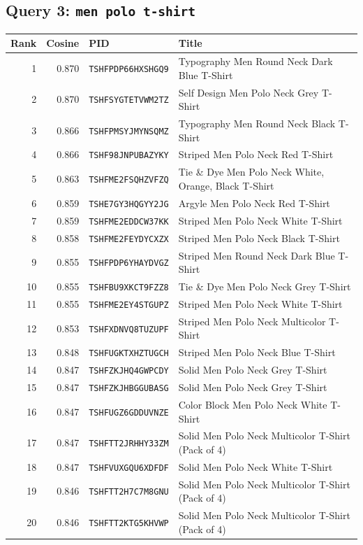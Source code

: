 \subsection*{Query 3: \texttt{men polo t-shirt}}
\begin{longtable}{r r l p{}}
\toprule
Rank & Cosine & PID & Title \\
\midrule
\endhead
1 & 0.870 & \texttt{TSHFPDP66HXSHGQ9} & Typography Men Round Neck Dark Blue T-Shirt \\
2 & 0.870 & \texttt{TSHFSYGTETVWM2TZ} & Self Design Men Polo Neck Grey T-Shirt \\
3 & 0.866 & \texttt{TSHFPMSYJMYNSQMZ} & Typography Men Round Neck Black T-Shirt \\
4 & 0.866 & \texttt{TSHF98JNPUBAZYKY} & Striped Men Polo Neck Red T-Shirt \\
5 & 0.863 & \texttt{TSHFME2FSQHZVFZQ} & Tie \& Dye Men Polo Neck White, Orange, Black T-Shirt \\
6 & 0.859 & \texttt{TSHE7GY3HQGYY2JG} & Argyle Men Polo Neck Red T-Shirt \\
7 & 0.859 & \texttt{TSHFME2EDDCW37KK} & Striped Men Polo Neck White T-Shirt \\
8 & 0.858 & \texttt{TSHFME2FEYDYCXZX} & Striped Men Polo Neck Black T-Shirt \\
9 & 0.855 & \texttt{TSHFPDP6YHAYDVGZ} & Striped Men Round Neck Dark Blue T-Shirt \\
10 & 0.855 & \texttt{TSHFBU9XKCT9FZZ8} & Tie \& Dye Men Polo Neck Grey T-Shirt \\
11 & 0.855 & \texttt{TSHFME2EY4STGUPZ} & Striped Men Polo Neck White T-Shirt \\
12 & 0.853 & \texttt{TSHFXDNVQ8TUZUPF} & Striped Men Polo Neck Multicolor T-Shirt \\
13 & 0.848 & \texttt{TSHFUGKTXHZTUGCH} & Striped Men Polo Neck Blue T-Shirt \\
14 & 0.847 & \texttt{TSHFZKJHQ4GWPCDY} & Solid Men Polo Neck Grey T-Shirt \\
15 & 0.847 & \texttt{TSHFZKJHBGGUBASG} & Solid Men Polo Neck Grey T-Shirt \\
16 & 0.847 & \texttt{TSHFUGZ6GDDUVNZE} & Color Block Men Polo Neck White T-Shirt \\
17 & 0.847 & \texttt{TSHFTT2JRHHY33ZM} & Solid Men Polo Neck Multicolor T-Shirt (Pack of 4) \\
18 & 0.847 & \texttt{TSHFVUXGQU6XDFDF} & Solid Men Polo Neck White T-Shirt \\
19 & 0.846 & \texttt{TSHFTT2H7C7M8GNU} & Solid Men Polo Neck Multicolor T-Shirt (Pack of 4) \\
20 & 0.846 & \texttt{TSHFTT2KTG5KHVWP} & Solid Men Polo Neck Multicolor T-Shirt (Pack of 4) \\
\end{longtable}
